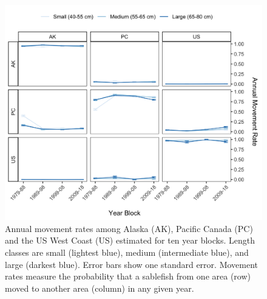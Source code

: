 \documentclass{article}
\begin{document}
\begin{figure}[htb]
    \centering
    \includegraphics[width = \textwidth]{figs/line-movement-03a-size-sml-timevary}
    \caption{Annual movement rates among Alaska (AK), Pacific Canada (PC) and the US West Coast (US) estimated for ten year blocks. Length classes are small (lightest blue), medium (intermediate blue), and large (darkest blue). Error bars show one standard error. Movement rates measure the probability that a sablefish from one area (row) moved to another area (column) in any given year.}
    \label{fig:line-movement-03a-size-sml-timevary}
\end{figure}

\end{document}

